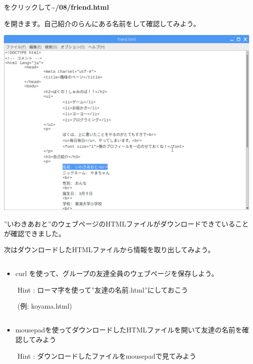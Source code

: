 をクリックして\textbf{{\textasciitilde}/08/friend.html}

を開きます。自己紹介のらんにある名前をして確認してみよう。



\begin{center}
\includegraphics[width=\textwidth]{./text08-img/textbook-img007.png}

\end{center}

\bigskip

”いわきあおと”のウェブページのHTMLファイルがダウンロードできていることが確認できました。

次はダウンロードしたHTMLファイルから情報を取り出してみよう。
\clearpage\subsection*{\theQuestion\label{Q:CURL}}
\begin{itemize}
\item curl
を使って、グループの友達全員のウェブページを保存しよう。
\end{itemize}
\ \ \ \ Hint :
ローマ字を使って”友達の名前.html”にしておこう

\ \ \ \ (例: koyama.html)

\subsection*{\theQuestion\label{Q:HTML}}
\begin{itemize}
\item
mousepadを使ってダウンロードしたHTMLファイルを開いて友達の名前を確認してみよう
\end{itemize}
\ \ \ \ Hint :
ダウンロードしたファイルをmousepadで見てみよう

